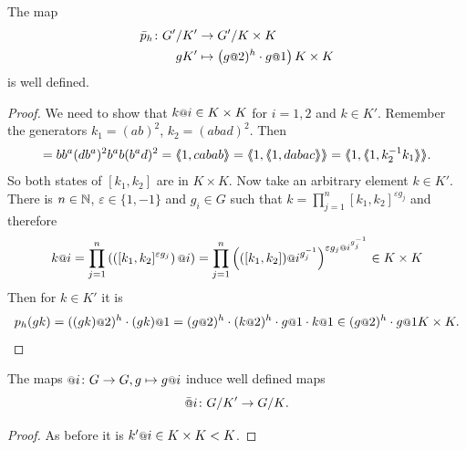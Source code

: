 \documentclass[a4paper,11pt]{amsart}
\begin{document}
\begin{lem} \label{lem:pIsDefinedModK'}
 The map 
 \begin{align*} 
  \bar p_h\colon \RNK{G'}{K'} &\to \RNK{G'}{K\times K}\\
  gK'&\mapsto \left(g\at{2})^h\cdot g\at{1}\right){K\times K}
 \end{align*}
is well defined.
\end{lem}
\begin{proof}
We need to show that $k\at{i} \in K\times K$ for $i=1,2$ and $k\in K'$. Remember the generators $k_1=(ab)^2$, $k_2=(abad)^2$. Then 
\begin{align*}
 [k_1,k_2]=bb^a(db^a)^2b^ab(b^ad)^2 = \pair{1,cabab}=\pair{1,\pair{1,dabac}}=\pair{1,\pair{1,k_2^{-1}k_1}}.
\end{align*}
So both states of $[k_1,k_2]$ are in $K\times K$. Now take an arbitrary element $k\in K'$.
There is $n\in\mathbb{N}$, $\varepsilon \in \{1,-1\}$ and $g_i\in G$ such that 
$k=\prod_{j=1}^n [k_1,k_2]^{\varepsilon g_j}$
and therefore 
\[k\at{i}=\prod_{j=1}^n\left( \left([k_1,k_2]^{\varepsilon g_j}\right)\at{i}\right)
	 = \prod_{j=1}^n \left(([k_1,k_2])\at{i^{g_j^{-1}}}\right)^{\varepsilon g_j\at{i^{g_j^{-1}}}}\in K\times K\]
 Then for $k\in K'$ it is 
 \[p_h(gk) = ((gk)\at{2})^h\cdot (gk)\at{1} = (g\at{2})^h\cdot (k\at{2})^h\cdot g\at{1}\cdot k\at{1}\in (g\at{2})^h\cdot g\at{1}K\times K.\]
\end{proof}
\begin{lem} \label{lem:atIsWellDefinedModK'}
 The maps $\at{i}\colon G\to G, g\mapsto g\at{i}$ induce well defined maps \[\att{i}\colon \RNK{G}{K'}\to\RNK{G}{K}.\]
\end{lem}
\begin{proof}
 As before it is $k'\at{i} \in K\times K < K$.
%  
%  
% 
\end{proof}
\end{document}
